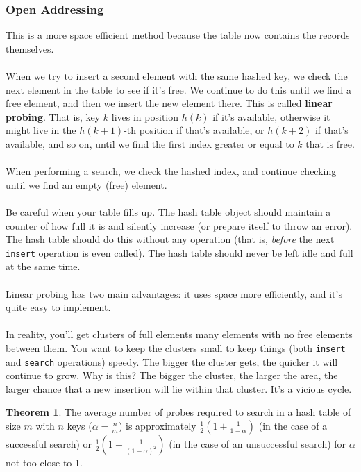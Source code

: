 \documentclass[]{article}
\theoremstyle{definition}
\newtheorem*{theorem}{Theorem}
\begin{document}
			\subsubsection{Open Addressing}
				This is a more space efficient method because the table now contains the records themselves.
				\\ \\
				When we try to insert a second element with the same hashed key, we check the next element in the table to see if it's free. We continue to do this until we find a free element, and then we insert the new element there. This is called \textbf{linear probing}. That is, key $k$ lives in position $h(k)$ if it's available, otherwise it might live in the $h(k + 1)$-th position if that's available, or $h(k + 2)$ if that's available, and so on, until we find the first index greater or equal to $k$ that is free.
				\\ \\
				When performing a search, we check the hashed index, and continue checking until we find an empty (free) element.
				\\ \\
				Be careful when your table fills up. The hash table object should maintain a counter of how full it is and silently increase (or prepare itself to throw an error). The hash table should do this without any operation (that is, \emph{before} the next \verb+insert+ operation is even called). The hash table should never be left idle and full at the same time.
				\\ \\
				Linear probing has two main advantages: it uses space more efficiently, and it's quite easy to implement.
				\\ \\
				In reality, you'll get clusters of full elements \textendash{} many elements with no free elements between them. You want to keep the clusters small to keep things (both \verb+insert+ and \verb+search+ operations) speedy. The bigger the cluster gets, the quicker it will continue to grow. Why is this? The bigger the cluster, the larger the area, the larger chance that a new insertion will lie within that cluster. It's a vicious cycle.
				\begin{theorem}
					The average number of probes required to search in a hash table of size $m$ with $n$ keys ($\alpha = \frac{n}{m}$) is approximately $\frac{1}{2}\left(1 + \frac{1}{1 - \alpha}\right)$ (in the case of a successful search) or $\frac{1}{2}\left(1 + \frac{1}{(1 - \alpha)^2}\right)$ (in the case of an unsuccessful search) for $\alpha$ not too close to 1.
				\end{theorem}
\end{document}
